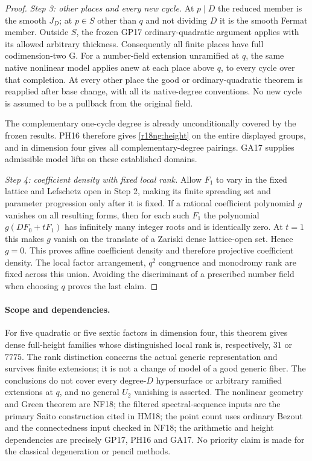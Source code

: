 \begin{proof}
\emph{Step 3: other places and every new cycle.}
At $p\mid D$ the reduced member is the smooth $J_D$;
at $p\in S$ other than $q$ and not dividing $D$ it
is the smooth Fermat member.  Outside $S$, the
frozen GP17 ordinary-quadratic argument applies with
its allowed arbitrary thickness.  Consequently all
finite places have full codimension-two G.  For a
number-field extension unramified at $q$, the same
native nonlinear model applies anew at each place
above $q$, to every cycle over that completion.
At every other place the good or ordinary-quadratic
theorem is reapplied after base change, with all its
native-degree conventions.  No new cycle is assumed
to be a pullback from the original field.

The complementary one-cycle degree is already
unconditionally covered by the frozen results.
PH16 therefore gives \eqref{r18ng:height} on the
entire displayed groups, and in dimension four gives
all complementary-degree pairings.  GA17 supplies
admissible model lifts on these established domains.

\emph{Step 4: coefficient density with fixed local rank.}
Allow $F_1$ to vary in the fixed lattice and Lefschetz
open in Step 2, making its finite spreading set and
parameter progression only after it is fixed.
If a rational coefficient polynomial $g$ vanishes
on all resulting forms, then for each such $F_1$
the polynomial $g(D F_0+tF_1)$ has infinitely many
integer roots and is identically zero.  At $t=1$
this makes $g$ vanish on the translate of a Zariski
dense lattice-open set.  Hence $g=0$.  This proves
affine coefficient density and therefore projective
coefficient density.  The local factor arrangement,
$q^2$ congruence and monodromy rank are fixed across
this union.  Avoiding the discriminant of a prescribed
number field when choosing $q$ proves the last claim.
\end{proof}

\paragraph{Scope and dependencies.}
For five quadratic or five sextic factors in dimension
four, this theorem gives dense full-height families
whose distinguished local rank is, respectively, $31$
or $7775$.  The rank distinction concerns the actual
generic representation and survives finite extensions;
it is not a change of model of a good generic fiber.
The conclusions do not cover every degree-$D$
hypersurface or arbitrary ramified extensions at $q$,
and no general $U_2$ vanishing is asserted.
The nonlinear geometry and Green theorem are NF18;
the filtered spectral-sequence inputs are the primary
Saito construction cited in HM18; the point count
uses ordinary Bezout and the connectedness input
checked in NF18; the arithmetic and height dependencies
are precisely GP17, PH16 and GA17.  No priority claim
is made for the classical degeneration or pencil methods.
